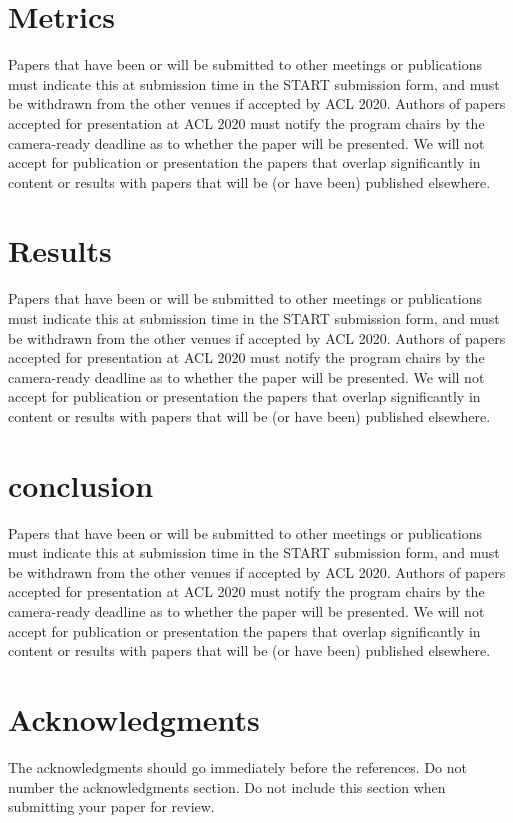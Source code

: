 \documentclass[11pt,a4paper]{article}
\begin{document}
\section{Metrics}
Papers that have been or will be submitted to other meetings or publications must indicate this at submission time in the START submission form, and must be withdrawn from the other venues if accepted by ACL 2020. Authors of papers accepted for presentation at ACL 2020 must notify the program chairs by the camera-ready deadline as to whether the paper will be presented. We will not accept for publication or presentation the papers that overlap significantly in content or results with papers that will be (or have been) published elsewhere.


\section{Results}
Papers that have been or will be submitted to other meetings or publications must indicate this at submission time in the START submission form, and must be withdrawn from the other venues if accepted by ACL 2020. Authors of papers accepted for presentation at ACL 2020 must notify the program chairs by the camera-ready deadline as to whether the paper will be presented. We will not accept for publication or presentation the papers that overlap significantly in content or results with papers that will be (or have been) published elsewhere.

\section{conclusion}
Papers that have been or will be submitted to other meetings or publications must indicate this at submission time in the START submission form, and must be withdrawn from the other venues if accepted by ACL 2020. Authors of papers accepted for presentation at ACL 2020 must notify the program chairs by the camera-ready deadline as to whether the paper will be presented. We will not accept for publication or presentation the papers that overlap significantly in content or results with papers that will be (or have been) published elsewhere.



\section*{Acknowledgments}

The acknowledgments should go immediately before the references. Do not number the acknowledgments section.
Do not include this section when submitting your paper for review.
\end{document}
